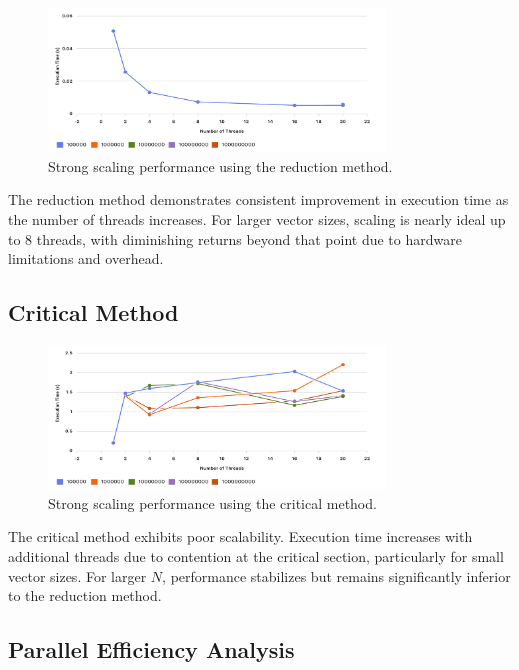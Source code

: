 \documentclass[unicode,11pt,a4paper,oneside,numbers=endperiod,openany]{scrartcl}
\begin{document}
\begin{figure}[h]
    \centering
    \includegraphics[width=0.8\textwidth]{./figures/Figure 1: Strong Scaling - Reduction Method.png}
    \caption{Strong scaling performance using the reduction method.}
\end{figure}

The reduction method demonstrates consistent improvement in execution time as the number of threads increases. For larger vector sizes, scaling is nearly ideal up to 8 threads, with diminishing returns beyond that point due to hardware limitations and overhead.

\subsection*{Critical Method}

\begin{figure}[h]
    \centering
    \includegraphics[width=0.8\textwidth]{./figures/Figure 2: Strong Scaling - Critical Method.png}
    \caption{Strong scaling performance using the critical method.}
\end{figure}

The critical method exhibits poor scalability. Execution time increases with additional threads due to contention at the critical section, particularly for small vector sizes. For larger $N$, performance stabilizes but remains significantly inferior to the reduction method.


\newpage
\subsection*{Parallel Efficiency Analysis}
\end{document}
